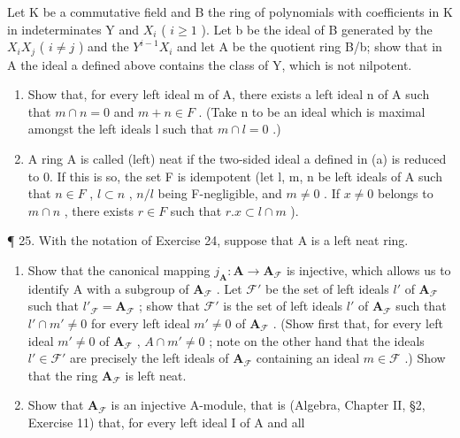 Let K be a commutative field and B the ring of polynomials with coefficients in K in indeterminates Y and \(X_{i}\) ( \(i \geqslant 1\) ). Let b be the ideal of B generated by the \(X_{i}X_{j}\) ( \(i \neq j\) ) and the \(Y^{i-1}X_{i}\) and let A be the quotient ring B/b; show that in A the ideal a defined above contains the class of Y, which is not nilpotent.

\begin{enumerate}
\def\labelenumi{(\alph{enumi})}
\setcounter{enumi}{1}
\item
  Show that, for every left ideal m of A, there exists a left ideal n of A such that \(m \cap n = 0\) and \(m + n \in F\) . (Take n to be an ideal which is maximal amongst the left ideals l such that \(m \cap l = 0\) .)
\item
  A ring A is called (left) neat if the two-sided ideal a defined in (a) is reduced to 0. If this is so, the set F is idempotent (let l, m, n be left ideals of A such that \(n \in F\) , \(l \subset n\) , \(n/l\) being F-negligible, and \(m \neq 0\) . If \(x \neq 0\) belongs to \(m \cap n\) , there exists \(r \in F\) such that \(r.x \subset l \cap m\) ).
\end{enumerate}

¶ 25. With the notation of Exercise 24, suppose that A is a left neat ring.

\begin{enumerate}
\def\labelenumi{(\alph{enumi})}
\item
  Show that the canonical mapping \(j_{\mathbf{A}}: \mathbf{A} \to \mathbf{A}_{\mathcal{F}}\) is injective, which allows us to identify A with a subgroup of \(\mathbf{A}_{\mathcal{F}}\) . Let \(\mathcal{F}'\) be the set of left ideals \(l'\) of \(\mathbf{A}_{\mathcal{F}}\) such that \(l'_{\mathcal{F}} = \mathbf{A}_{\mathcal{F}}\) ; show that \(\mathcal{F}'\) is the set of left ideals \(l'\) of \(\mathbf{A}_{\mathcal{F}}\) such that \(l' \cap m' \neq 0\) for every left ideal \(m' \neq 0\) of \(\mathbf{A}_{\mathcal{F}}\) . (Show first that, for every left ideal \(m' \neq 0\) of \(\mathbf{A}_{\mathcal{F}}\) , \(A \cap m' \neq 0\) ; note on the other hand that the ideals \(l' \in \mathcal{F}'\) are precisely the left ideals of \(\mathbf{A}_{\mathcal{F}}\) containing an ideal \(m \in \mathcal{F}\) .) Show that the ring \(\mathbf{A}_{\mathcal{F}}\) is left neat.
\item
  Show that \(\mathbf{A}_{\mathcal{F}}\) is an injective A-module, that is (Algebra, Chapter II, §2, Exercise 11) that, for every left ideal I of A and all
\end{enumerate}

